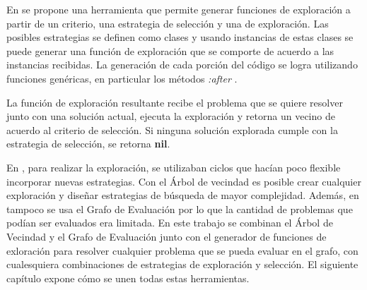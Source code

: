 En \cite{Heidy} se propone una herramienta que permite generar funciones de exploración a partir de un criterio, una estrategia de selección y una de exploración. Las posibles estrategias se definen como clases y usando instancias de estas clases se puede generar una función de exploración que se comporte de acuerdo a las instancias recibidas. La generación de cada porción del código se logra utilizando funciones genéricas, en particular los métodos \textit{:after} \cite{TODO}.

La función de exploración resultante recibe el problema que se quiere resolver junto con una solución actual, ejecuta la exploración y retorna un vecino de acuerdo al criterio de selección. Si ninguna solución explorada cumple con la estrategia de selección, se retorna \textbf{nil}. 

En \cite{Heidy}, para realizar la exploración, se utilizaban ciclos que hacían poco flexible incorporar nuevas estrategias. Con el Árbol de vecindad es posible crear cualquier exploración y diseñar estrategias de búsqueda de mayor complejidad. Además, en \cite{Heidy} tampoco se usa el Grafo de Evaluación por lo que la cantidad de problemas que podían ser evaluados era limitada. En este trabajo se combinan el Árbol de Vecindad y el Grafo de Evaluación junto con el generador de funciones de exloración para resolver cualquier problema que se pueda evaluar en el grafo, con cualesquiera combinaciones de estrategias de exploración y selección. El siguiente capítulo expone cómo se unen todas estas herramientas.





























